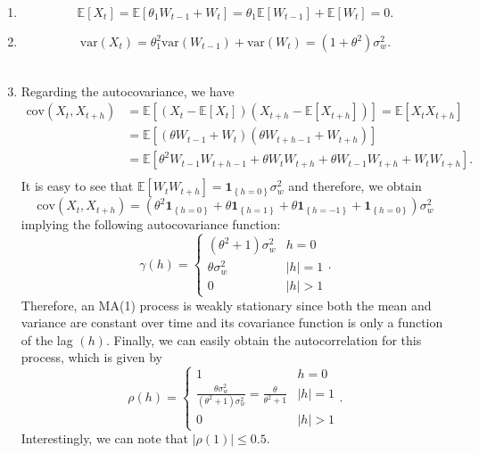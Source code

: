 \documentclass[]{book}
\providecommand{\tightlist}{%
  \setlength{\itemsep}{0pt}\setlength{\parskip}{0pt}}
\theoremstyle{definition}
\theoremstyle{definition}
\theoremstyle{definition}
\theoremstyle{remark}
\begin{document}
\begin{enumerate}
\def\labelenumi{\arabic{enumi}.}
\tightlist
\item
  \[ 
   \mathbb{E}\left[ {{X_t}} \right] = \mathbb{E}\left[ {{\theta_1}{W_{t - 1}} + {W_t}} \right] 
   = {\theta_1} \mathbb{E} \left[ {{W_{t - 1}}} \right] + \mathbb{E}\left[ {{W_t}} \right] 
   = 0. \]
\item
  \[\text{var} \left( {{X_t}} \right) = \theta_1^2 \text{var} \left( W_{t - 1}\right) + \text{var} \left( W_{t}\right) = \left(1 + \theta^2 \right) \sigma^2_w.\]\\
\item
  Regarding the autocovariance, we have \[\begin{aligned}
  \text{cov}\left( {{X_t},{X_{t + h}}} \right) &= \mathbb{E}\left[ {\left( {{X_t} - \mathbb{E}\left[ {{X_t}} \right]} \right)\left( {{X_{t + h}} - \mathbb{E}\left[ {{X_{t + h}}} \right]} \right)} \right] = \mathbb{E}\left[ {{X_t}{X_{t + h}}} \right] \\
  &= \mathbb{E}\left[ {\left( {{\theta}{W_{t - 1}} + {W_t}} \right)\left( {{\theta }{W_{t + h - 1}} + {W_{t + h}}} \right)} \right] \\
  &= \mathbb{E}\left[ {\theta^2{W_{t - 1}}{W_{t + h - 1}} + \theta {W_t}{W_{t + h}} + {\theta}{W_{t - 1}}{W_{t + h}} + {W_t}{W_{t + h}}} \right]. \\
  \end{aligned} \] It is easy to see that
  \(\mathbb{E}\left[ {{W_t}{W_{t + h}}} \right] = {\boldsymbol{1}_{\left\{ {h = 0} \right\}}}\sigma _w^2\)
  and therefore, we obtain
  \[\text{cov} \left( {{X_t},{X_{t + h}}} \right) = \left( {\theta^2{ \boldsymbol{1}_{\left\{ {h = 0} \right\}}} + {\theta}{\boldsymbol{1}_{\left\{ {h = 1} \right\}}} + {\theta}{\boldsymbol{1}_{\left\{ {h =  - 1} \right\}}} + {\boldsymbol{1}_{\left\{ {h = 0} \right\}}}} \right)\sigma _w^2\]
  implying the following autocovariance function:
  \[\gamma \left( h \right) = \left\{ {\begin{array}{*{20}{c}}
   {\left( {\theta^2 + 1} \right)\sigma _w^2}&{h = 0} \\ 
   {{\theta}\sigma _w^2}&{\left| h \right| = 1} \\ 
   0&{\left| h \right| > 1} 
   \end{array}} \right. .\] Therefore, an MA(1) process is weakly
  stationary since both the mean and variance are constant over time and
  its covariance function is only a function of the lag \((h)\).
  Finally, we can easily obtain the autocorrelation for this process,
  which is given by
  \[\rho \left( h \right) = \left\{ {\begin{array}{*{20}{c}}
    1&{h = 0} \\ 
    {\frac{{{\theta}\sigma _w^2}}{{\left( {\theta^2 + 1} \right)\sigma _w^2}} = \frac{{{\theta}}}{{\theta^2 + 1}}}&{\left| h \right| = 1} \\ 
    0&{\left| h \right| > 1} 
    \end{array}} \right. .\] Interestingly, we can note that
  \(|\rho(1)| \leq 0.5\).

\end{enumerate}
\end{document}
